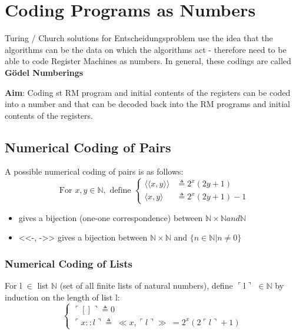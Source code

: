 \documentclass{article}
\begin{document}
\section{Coding Programs as Numbers}
Turing / Church solutions for Entscheidungsproblem use the idea that the algorithms can be the data on which the algorithms act - therefore need to be able to code Register Machines as numbers. In general, these codings are called \textbf{Gödel Numberings}

\bigskip
\textbf{Aim}: Coding st RM program and initial contents of the registers can be coded into a number and that can be decoded back into the RM programs and initial contents of the registers.

\subsection{Numerical Coding of Pairs}
A possible numerical coding of pairs is as follows:
\begin{equation}
    \text { For } x, y \in \mathbb{N}, \text { define } \left\{\begin{array}{cc}{\langle\langle x, y\rangle\rangle} & {\triangleq 2^{x}(2 y+1)} \\ {\langle x, y\rangle} & {\triangleq 2^{x}(2 y+1)-1}\end{array}\right.
\end{equation}
\begin{itemize}
    \item <-, -> gives a bijection (one-one correspondence) between $\mathbb{N} \times \mathbb{N} and \mathbb{N}$
    \item <<-, ->> gives a bijection between $\mathbb{N} \times \mathbb{N}$ and $\{ n\in \mathbb{N} | n \neq 0 \}$
\end{itemize}

\subsubsection{Numerical Coding of Lists}
For l $\in$ list $\mathbb{N}$ (set of all finite lists of natural numbers), define $\ulcorner$l$\urcorner$ $\in \mathbb{N}$ by induction on the length of list l:
\begin{equation}
\left\{
\begin{array}{l}{
\ulcorner [] \urcorner \triangleq 0
} 
\\ 
{
\ulcorner x::l \urcorner \triangleq \; \ll x, \ulcorner l \urcorner \gg \; = 2^{x} (2 \ulcorner l \urcorner + 1)
}
\end{array}
\right.
\end{equation}
\end{document}
